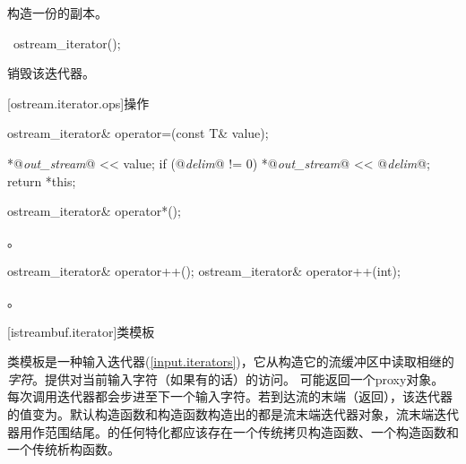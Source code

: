 \begin{itemdescr}
\pnum
\effects
构造一份的副本。
\end{itemdescr}

%
\begin{itemdecl}
~ostream_iterator();
\end{itemdecl}

\begin{itemdescr}
\pnum
\effects
销毁该迭代器。
\end{itemdescr}

[ostream.iterator.ops]{操作}

%
%
\begin{itemdecl}
ostream_iterator& operator=(const T& value);
\end{itemdecl}

\begin{itemdescr}
\pnum
\effects
\begin{codeblock}
*@\textit{out_stream}@ << value;
if (@\textit{delim}@ != 0)
  *@\textit{out_stream}@ << @\textit{delim}@;
return *this;
\end{codeblock}
\end{itemdescr}

%
%
\begin{itemdecl}
ostream_iterator& operator*();
\end{itemdecl}

\begin{itemdescr}
\pnum
\returns
{}。
\end{itemdescr}

%
%
\begin{itemdecl}
ostream_iterator& operator++();
ostream_iterator& operator++(int);
\end{itemdecl}

\begin{itemdescr}
\pnum
\returns
{}。
\end{itemdescr}

[istreambuf.iterator]{类模板}

\pnum
类模板是一种输入迭代器(\ref{input.iterators})，它从构造它的流缓冲区中读取相继的\textit{字符}。提供对当前输入字符（如果有的话）的访问。
\enternote {}可能返回一个proxy对象。 \exitnote
每次调用迭代器都会步进至下一个输入字符。若到达流的末端（返回），该迭代器的值变为。默认构造函数和构造函数构造出的都是流末端迭代器对象，流末端迭代器用作范围结尾。的任何特化都应该存在一个传统拷贝构造函数、一个构造函数和一个传统析构函数。

